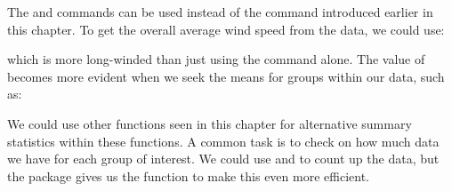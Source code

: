  
The   and  commands can be used instead of the  command introduced earlier in this chapter. To get the overall average wind speed from the  data, we could use: 
\begin{knitrout}
\color{fgcolor}
\end{knitrout}
which is more long-winded than just using the  command alone. The value of  becomes more evident when we seek the means for groups within our data, such as: 
\begin{knitrout}
\color{fgcolor}
\end{knitrout}
 
We could use other functions seen in this chapter for alternative summary statistics within these functions. A common task is to check on how much data we have for each group of interest. We could use  and  to count up the data, but the  package gives us the  function to make this even more efficient. 
\begin{knitrout}
\color{fgcolor}
\end{knitrout}
 
